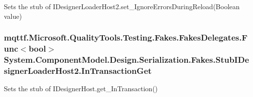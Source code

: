 Sets the stub of I\-Designer\-Loader\-Host2.\-set\-\_\-\-Ignore\-Errors\-During\-Reload(\-Boolean value)

\hypertarget{class_system_1_1_component_model_1_1_design_1_1_serialization_1_1_fakes_1_1_stub_i_designer_loader_host2_aa629e7dc8ef1a2bee4c4e72ba7ca0edd}{
\subsubsection[{In\-Transaction\-Get}]{\setlength{\rightskip}{0pt plus 5cm}mqttf.\-Microsoft.\-Quality\-Tools.\-Testing.\-Fakes.\-Fakes\-Delegates.\-Func$<$bool$>$ System.\-Component\-Model.\-Design.\-Serialization.\-Fakes.\-Stub\-I\-Designer\-Loader\-Host2.\-In\-Transaction\-Get}}\label{class_system_1_1_component_model_1_1_design_1_1_serialization_1_1_fakes_1_1_stub_i_designer_loader_host2_aa629e7dc8ef1a2bee4c4e72ba7ca0edd}


Sets the stub of I\-Designer\-Host.\-get\-\_\-\-In\-Transaction()


